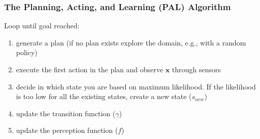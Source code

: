 \documentclass{beamer}
\def\bx{\pmb{x}}
\begin{document}
\begin{frame}
\frametitle{The Planning, Acting, and Learning (PAL) Algorithm}
Loop until goal reached: 
\begin{enumerate}
\item generate a plan (if no plan exists explore the domain, e.g., with a random policy) 
\item execute the first action in the plan and observe $\bx$ through sensors
\item \alert<2>{decide in which state you are based on maximum likelihood. If the likelihood  is too low for all the existing states, create a new state ($s_{new}$)}
\item update the transition function ($\gamma$) 
\item update the perception function ($f$)
\end{enumerate}
\end{frame}
\end{document}
